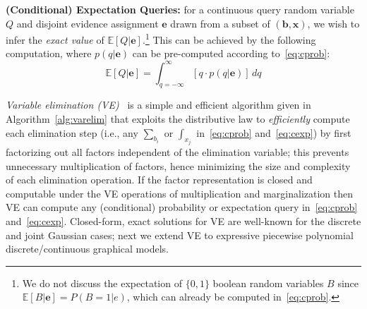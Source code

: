 \documentclass[letterpaper]{article}
\newcommand{\E}{\mathbb{E}}
\renewcommand{\vec}[1]{\mathbf{#1}}
\begin{document}
{\bf (Conditional) Expectation Queries:} for a continuous
query random variable
$Q$ and disjoint evidence assignment $\vec{e}$ drawn from 
a subset of $(\vec{b},\vec{x})$, we wish to infer 
the \emph{exact value} of $\E[Q|\vec{e}]$.\footnote{We do not 
discuss the expectation of $\{0,1\}$ boolean
random variables $B$ since $\E[B|\vec{e}] = P(B=1|e)$, which can 
already be computed in~\eqref{eq:cprob}.} 
This can be achieved by the following
computation, where $p(q|\vec{e})$ can be pre-computed according to~\eqref{eq:cprob}:
\begin{equation} 
\E[Q|\vec{e}] = 
\int_{q=-\infty}^{\infty} [q \cdot p(q|\vec{e})] \, dq \label{eq:cexp}
\end{equation}

\emph{Variable elimination (VE)}~\cite{varelim} is a simple and
efficient algorithm given in Algorithm~\ref{alg:varelim} that exploits
the distributive law to \emph{efficiently} compute each elimination
step (i.e., any $\sum_{b_{i}}$ or $\int_{x_{j}}$ in~\eqref{eq:cprob}
and~\eqref{eq:cexp}) by first factorizing out all factors independent
of the elimination variable; this prevents unnecessary multiplication
of factors, hence minimizing the size and complexity of each
elimination operation.  If the factor representation is closed and
computable under the VE operations of multiplication and
marginalization then VE can compute any (conditional) probability or
expectation query in~\eqref{eq:cprob} and~\eqref{eq:cexp}.  
Closed-form, exact solutions for VE are well-known for the discrete
and joint Gaussian cases; next we extend VE to expressive
piecewise polynomial discrete/continuous graphical models.

\end{document}

